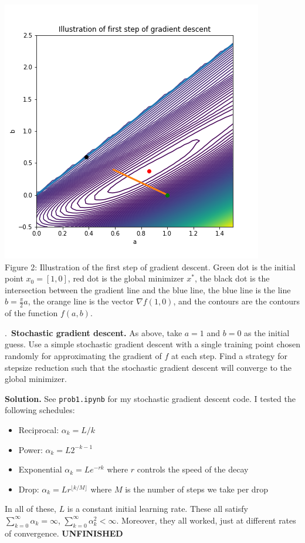 \documentclass{letter}
\newcounter{problem}
\newcommand{\Problem}[2]{%
	\stepcounter{problem}%
	\leftskip=0pt%
	\theproblem.~\textbf{{#1.}} #2 \par%
}
\newcommand{\Solution}[1]{%
	\textbf{Solution.} #1 \par%
}
\newcommand{\UNFINISHED}{\textbf{\color{red} UNFINISHED}}
\begin{document}
{    \begin{center}
        \includegraphics{../pics/gd_firststep.png} \\
        Figure 2: Illustration of the first step of gradient descent. Green dot is the initial point $x_0 = [1, 0]$, red dot is the global minimizer $x^*$, the black dot is the intersection between the gradient line and the blue line, the blue line is the line $b = \frac{\pi}{2}a$, the orange line is the vector $\nabla f(1, 0)$, and the contours are the contours of the function $f(a, b)$.
    \end{center}}

    \Problem{Stochastic gradient descent}{As above, take $a = 1$ and $b = 0$ as the initial guess. Use a simple stochastic gradient descent with a single training point chosen randomly for approximating the gradient of $f$ at each step. Find a strategy for stepsize reduction such that the stochastic gradient descent will converge to the global minimizer.}
    \Solution{See \texttt{prob1.ipynb} for my stochastic gradient descent code. I tested the following schedules: \begin{itemize}
        \item Reciprocal: $\alpha_k = L/k$
        \item Power: $\alpha_k = L2^{-k-1}$
        \item Exponential $\alpha_k = Le^{-rk}$ where $r$ controls the speed of the decay
        \item Drop: $\alpha_k = Lr^{\lfloor k/M \rfloor}$ where $M$ is the number of steps we take per drop
    \end{itemize} In all of these, $L$ is a constant initial learning rate. These all satisfy $\sum_{k=0}^\infty \alpha_k = \infty$, $\sum_{k=0}^\infty \alpha_k^2 < \infty$. Moreover, they all worked, just at different rates of convergence. \UNFINISHED}
\end{document}
